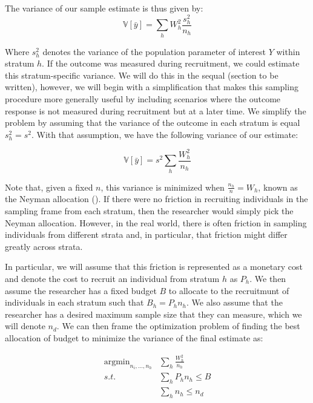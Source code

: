 \message{ !name(survey-sampling-with-ads.tex)}\documentclass[a4paper,12pt]{article}
\theoremstyle{proposition}
\DeclareMathOperator*{\argmin}{argmin}
\begin{document}




The variance of our sample estimate is thus given by:
$$
\mathbb{V}[\bar{y}] =  \sum_{h}  W_h^2 \frac{s_h^2}{n_h}
$$


Where $s_h^2$ denotes the variance of the population parameter of interest $Y$ within stratum $h$. If the outcome was measured during recruitment, we could estimate this stratum-specific variance. We will do this in the sequal (section to be written), however, we will begin with a simplification that makes this sampling procedure more generally useful by including scenarios where the outcome response is not measured during recruitment but at a later time. We simplify the problem by assuming that the variance of the outcome in each stratum is equal $s_h^2 = s^2$. With that assumption, we have the following variance of our estimate:

$$
\mathbb{V}[\bar{y}] =  s^2  \sum_{h}  \frac{W_h^2}{n_h}
$$

Note that, given a fixed $n$, this variance is minimized when $\frac{n_h}{n} = W_h$, known as the Neyman allocation (\cite{Neyman}). If there were no friction in recruiting individuals in the sampling frame from each stratum, then the researcher would simply pick the Neyman allocation. However, in the real world, there is often friction in sampling individuals from different strata and, in particular, that friction might differ greatly across strata.

In particular, we will assume that this friction is represented as a monetary cost and denote the cost to recruit an individual from stratum $h$ as $P_h$. We then assume the researcher has a fixed budget $B$ to allocate to the recruitmunt of individuals in each stratum such that $B_h = P_hn_h$. We also assume that the researcher has a desired maximum sample size that they can measure, which we will denote $n_d$. We can then frame the optimization problem of finding the best allocation of budget to minimize the variance of the final estimate as:


\begin{align*}
\argmin_{n_i,...,n_h}  &\sum_{h}  \frac{W_h^2}{n_h} \\
s.t. &\sum_h P_hn_h \leq B \\
     &\sum_h n_h \leq n_d
\end{align*}
\end{document}
